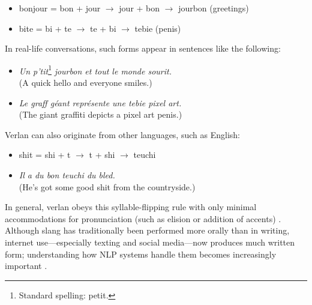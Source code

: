 \documentclass[12pt]{article}
\begin{document}
\begin{flushleft}
\small
\begin{itemize}
  \item bonjour = bon + jour \(\rightarrow\) jour + bon \(\rightarrow\) jourbon (greetings)
  \item bite = bi + te \(\rightarrow\) te + bi \(\rightarrow\) tebie (penis)
\end{itemize}
\end{flushleft}

\noindent In real-life conversations, such forms appear in sentences like the following:

\begin{flushleft}
\small
\begin{itemize}
  \item \textit{Un p'tit}\footnote{Standard spelling: petit.}\textit{ jourbon et tout le monde sourit.}\\(A quick hello and everyone smiles.)
  \item \textit{Le graff géant représente une tebie pixel art.}\\(The giant graffiti depicts a pixel art penis.)
\end{itemize}
\end{flushleft}

\noindent Verlan can also originate from other languages, such as English:

\begin{flushleft}
\small
\begin{itemize}
  \item shit = shi + t \(\rightarrow\) t + shi \(\rightarrow\) teuchi \cite{evolutionverlan}
  \item \textit{Il a du bon teuchi du bled.}\\(He's got some good shit from the countryside.)
\end{itemize}
\end{flushleft}

\noindent In general, verlan obeys this syllable-flipping rule with only minimal accommodations for pronunciation (such as elision or addition of accents) \cite{rajabov2025}. Although slang has traditionally been performed more orally than in writing, internet use\;---\;especially texting and social media\;---\;now produces much written form; understanding how NLP systems handle them becomes increasingly important \cite{rua2005}.
\end{document}
